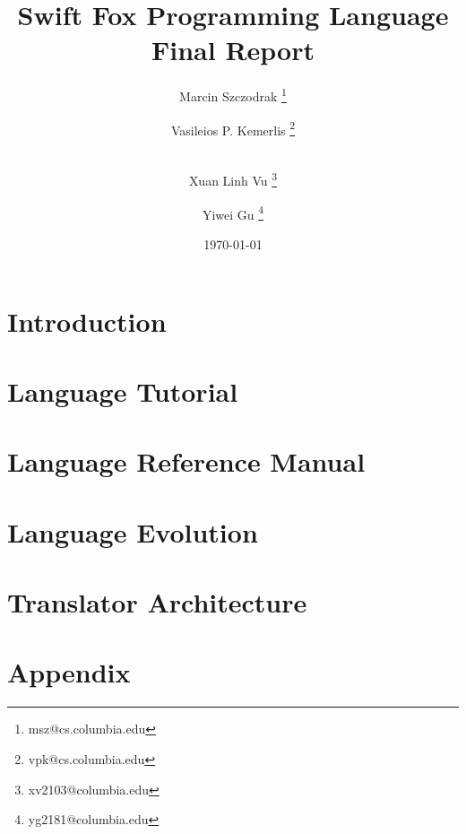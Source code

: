 \documentclass[11pt]{report}
\begin{document}
\title{Swift Fox Programming Language\\ Final Report}
\author{Marcin Szczodrak \footnote{msz@cs.columbia.edu}}
\author{Vasileios P. Kemerlis \footnote{vpk@cs.columbia.edu}}
\author{\\ Xuan Linh Vu \footnote{xv2103@columbia.edu}}
\author{Yiwei Gu \footnote{yg2181@columbia.edu}}
\date{\today}
\maketitle

\tableofcontents

\chapter{Introduction}
\newpage


\chapter{Language Tutorial}
\newpage


\chapter{Language Reference Manual}
\newpage


%

\chapter{Language Evolution}
\newpage


\chapter{Translator Architecture}
\newpage


%

%

%

\chapter{Appendix}
\newpage


\end{document}

